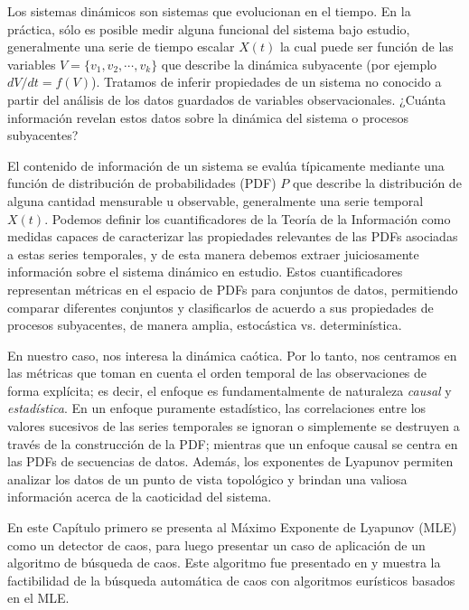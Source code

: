 Los sistemas dinámicos son sistemas que evolucionan en el tiempo.
En la práctica, sólo es posible medir alguna funcional del sistema bajo estudio, generalmente una serie de tiempo escalar $X(t)$ la cual puede ser función de las variables $V=\{ v_1, v_2,\cdots, v_k\}$ que describe la dinámica subyacente (por ejemplo $dV/dt=f(V)$).
Tratamos de inferir propiedades de un sistema no conocido a partir del análisis de los datos guardados de variables observacionales.
¿Cuánta información revelan estos datos sobre la dinámica del sistema o procesos subyacentes?

El contenido de información de un sistema se evalúa típicamente mediante una función de distribución de probabilidades (PDF) $P$ que describe la distribución de alguna cantidad mensurable u observable, generalmente una serie temporal $X(t)$.
Podemos definir los cuantificadores de la Teoría de la Información como medidas capaces de caracterizar las propiedades relevantes de las PDFs asociadas a estas series temporales, y de esta manera debemos extraer juiciosamente información sobre el sistema dinámico en estudio.
Estos cuantificadores representan métricas en el espacio de PDFs para conjuntos de datos, permitiendo comparar diferentes conjuntos y clasificarlos de acuerdo a sus propiedades de procesos subyacentes, de manera amplia, estocástica vs. determinística.

En nuestro caso, nos interesa la dinámica caótica.
Por lo tanto, nos centramos en las métricas que toman en cuenta el orden temporal de las observaciones de forma explícita; es decir, el enfoque es fundamentalmente de naturaleza \textit{causal} y \textit{estadística}.
En un enfoque puramente estadístico, las correlaciones entre los valores sucesivos de las series temporales se ignoran o simplemente se destruyen a través de la construcción de la PDF; mientras que un enfoque causal se centra en las PDFs de secuencias de datos.
Además, los exponentes de Lyapunov permiten analizar los datos de un punto de vista topológico y brindan una valiosa información acerca de la caoticidad del sistema.

En este Capítulo primero se presenta al Máximo Exponente de Lyapunov (MLE) como un detector de caos, para luego presentar un caso de aplicación de un algoritmo de búsqueda de caos.
Este algoritmo fue presentado en \cite{CASE2013} y muestra la factibilidad de la búsqueda automática de caos con algoritmos eurísticos basados en el  MLE.

